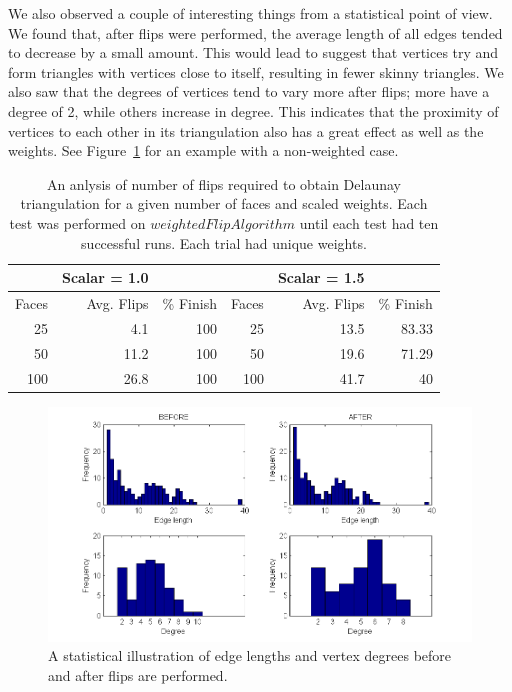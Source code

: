 \documentclass[12pt]{article}
\begin{document}
\noindent We also observed a couple of interesting things from a statistical point of view. We found that, after flips were performed, the average length of all edges tended to decrease by a small amount. This would lead to suggest that vertices try and form triangles with vertices close to itself, resulting in fewer skinny triangles. We also saw that the degrees of vertices tend to vary more after flips; more have a degree of 2, while others increase in degree. This indicates that the proximity of vertices to each other in its triangulation also has a great effect as well as the weights. See Figure~\ref{stats} for an example with a non-weighted case.\newline
\begin{table}
\begin{center}
\begin{tabular}{|rrr|rrr|}
 \hline
 &Scalar = 1.0      &            &            &  Scalar = 1.5           &          \\ \hline

   Faces & Avg. Flips & \% Finish &               Faces & Avg. Flips & \% Finish \\ \hline

        25 &        4.1 &        100 &                    25 &       13.5 &      83.33 \\

        50 &       11.2 &        100 &                     50 &       19.6 &      71.29 \\

       100 &       26.8 &        100 &                   100 &       41.7 &         40 \\ \hline

\end{tabular} 
\end{center}
\caption{An anlysis of number of flips required to obtain Delaunay triangulation for a given number of faces and scaled weights. Each test was performed on $weightedFlipAlgorithm$ until each test had ten successful runs. Each trial had unique weights.} 
\end{table} 

\begin{figure}
\centering
\includegraphics[scale = 0.6]{Pictures/Stats.png}
\caption{A statistical illustration of edge lengths and vertex degrees before and after flips are performed.}
\label{stats}
\end{figure}
\end{document}
